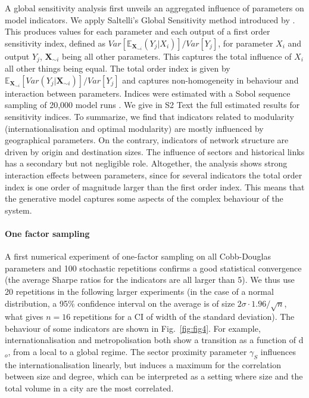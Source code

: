 \documentclass[10pt,letterpaper]{article}
\begin{document}
A global sensitivity analysis first unveils an aggregated influence of parameters on model indicators. We apply Saltelli's Global Sensitivity method introduced by \cite{saltelli2008global}. This produces values for each parameter and each output of a first order sensitivity index, defined as $Var\left[\mathbb{E}_{\mathbf{X}_{\sim i}}\left(Y_j | X_i\right)\right] / Var\left[Y_j\right]$, for parameter $X_i$ and output $Y_j$, $\mathbf{X}_{\sim i}$ being all other parameters. This captures the total influence of $X_i$ all other things being equal. The total order index is given by $\mathbb{E}_{\mathbf{X}_{\sim i}} \left[Var(Y_j | \mathbf{X}_{\sim i})\right] / Var\left[Y_j\right]$ and captures non-homogeneity in behaviour and interaction between parameters. Indices were estimated with a Sobol sequence sampling of 20,000 model runs \cite{saltelli2010variance}. We give in S2 Text the full estimated results for sensitivity indices. To summarize, we find that indicators related to modularity (internationalisation and optimal modularity) are mostly influenced by geographical parameters. On the contrary, indicators of network structure are driven by origin and destination sizes. The influence of sectors and historical links has a secondary but not negligible role. Altogether, the analysis shows strong interaction effects between parameters, since for several indicators the total order index is one order of magnitude larger than the first order index. This means that the generative model captures some aspects of the complex behaviour of the system.



\paragraph{One factor sampling}

A first numerical experiment of one-factor sampling on all Cobb-Douglas parameters and 100 stochastic repetitions confirms a good statistical convergence (the average Sharpe ratios for the indicators are all larger than 5). We thus use 20 repetitions in the following larger experiments (in the case of a normal distribution, a 95\% confidence interval on the average is of size $2\sigma \cdot 1.96 / \sqrt{n}$, what gives $n=16$ repetitions for a CI of width of the standard deviation). The behaviour of some indicators are shown in Fig.~\ref{fig:fig4}. For example, internationalisation and metropolisation both show a transition as a function of d$_o$, from a local to a global regime. The sector proximity parameter $\gamma_S$ influences the internationalisation linearly, but induces a maximum for the correlation between size and degree, which can be interpreted as a setting where size and the total volume in a city are the most correlated.
\end{document}
